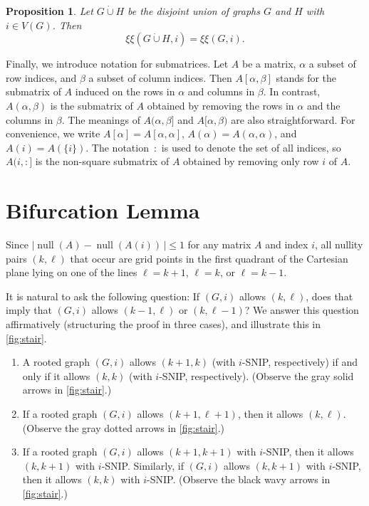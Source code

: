 \documentclass{article}
\newtheorem{proposition}[theorem]{Proposition}
\theoremstyle{definition}
\newcommand{\dunion}{\mathbin{\dot\cup}}
\newcommand{\nul}{\operatorname{null}}
\newcommand{\excise}{\xi\xi}
\begin{document}
\begin{proposition}
\label{prop:disjoint}
Let $G\dunion H$ be the disjoint union of graphs $G$ and $H$ with $i\in V(G)$.  Then 
\[
    \excise(G\dunion H, i) = \excise(G, i).
\]
\end{proposition}

Finally, we introduce notation for submatrices.  Let $A$ be a matrix, $\alpha$ a subset of row indices, and $\beta$ a subset of column indices.  Then $A[\alpha,\beta]$ stands for the submatrix of $A$ induced on the rows in $\alpha$ and columns in $\beta$.  In contrast, $A(\alpha,\beta)$ is the submatrix of $A$ obtained by removing the rows in $\alpha$ and the columns in $\beta$.  The meanings of $A(\alpha,\beta]$ and $A[\alpha,\beta)$ are also straightforward.  For convenience, we write $A[\alpha] = A[\alpha,\alpha]$, $A(\alpha) = A(\alpha,\alpha)$, and $A(i) = A(\{i\})$.    The notation~$:$ is used to denote the set of all indices, so $A(i,:]$ is the non-square submatrix of $A$ obtained by removing only row $i$ of $A$.

\section{Bifurcation Lemma}
\label{sec:bif}
Since $|\nul(A) - \nul(A(i))\,| \leq 1$ for any matrix $A$ and index $i$, all nullity pairs $(k,\ell)$ that occur are grid points in the first quadrant of the Cartesian plane lying on one of the lines $\ell = k + 1$, $\ell = k$, or $\ell = k - 1$.  

It is natural to ask the following question: If $(G,i)$ allows $(k,\ell)$, does that imply that $(G,i)$ allows $(k-1,\ell)$ or $(k,\ell-1)$?  We answer this question affirmatively (structuring the proof in three cases), and illustrate this in \cref{fig:stair}.
\begin{enumerate}
\item A rooted graph $(G,i)$ allows $(k+1,k)$ (with $i$-SNIP, respectively) if and only if it allows $(k,k)$ (with $i$-SNIP, respectively). (Observe the gray solid arrows in \cref{fig:stair}.)
\item If a rooted graph $(G,i)$ allows $(k+1,\ell+1)$, then it allows $(k,\ell)$. (Observe the gray dotted arrows in \cref{fig:stair}.)
\item If a rooted graph $(G,i)$ allows $(k+1,k+1)$ with $i$-SNIP, then it allows $(k,k+1)$ with $i$-SNIP.  Similarly, if $(G,i)$ allows $(k,k+1)$ with $i$-SNIP, then it allows $(k,k)$ with $i$-SNIP.   (Observe the black wavy arrows in \cref{fig:stair}.)
\end{enumerate}
\end{document}
